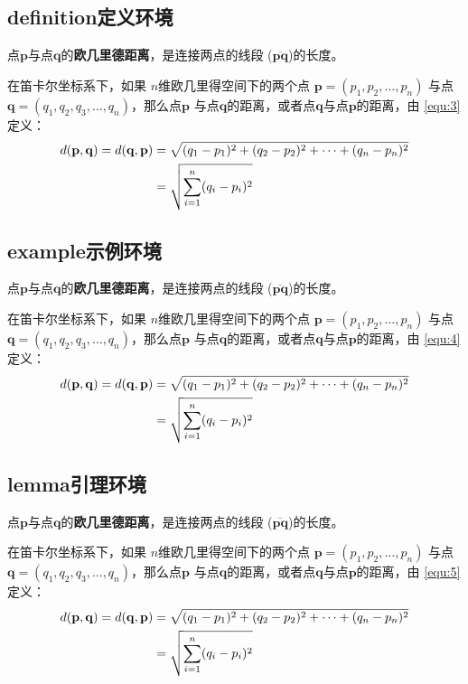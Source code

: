 \subsection{definition定义环境}

\begin{definition}[欧几里得距离]
点$\mathbf{p}$与点$\mathbf{q}$的\textbf{欧几里德距离}，是连接两点的线段
($\overline{\mathbf{pq}}$)的长度。

在笛卡尔坐标系下，如果 $n$维欧几里得空间下的两个点 $\mathbf{p}=(p_1, p_2,
\dots, p_n)$ 与点$\mathbf{q} = (q_1, q_2, q_3, \dots, q_n)$，那么点$\mathbf{p}$
与点$\mathbf{q}$的距离，或者点$\mathbf{q}$与点$\mathbf{p}$的距离，由
\autoref{equ:3}定义：
\begin{align}
d(\mathbf{p},\mathbf{q}) = d(\mathbf{q},\mathbf{p}) & = \sqrt{(q_1-p_1)^2
                         + (q_2-p_2)^2 + \cdots + (q_n-p_n)^2} \notag \\
\label{equ:3}
& = \sqrt{\sum_{i=1}^n (q_i-p_i)^2}
\end{align}
\end{definition}

\subsection{example示例环境}

\begin{example}[欧几里得距离]
点$\mathbf{p}$与点$\mathbf{q}$的\textbf{欧几里德距离}，是连接两点的线段
($\overline{\mathbf{pq}}$)的长度。

在笛卡尔坐标系下，如果 $n$维欧几里得空间下的两个点 $\mathbf{p}=(p_1, p_2,
\dots, p_n)$ 与点$\mathbf{q} = (q_1, q_2, q_3, \dots, q_n)$，那么点$\mathbf{p}$
与点$\mathbf{q}$的距离，或者点$\mathbf{q}$与点$\mathbf{p}$的距离，由
\autoref{equ:4}定义：
\begin{align}
d(\mathbf{p},\mathbf{q}) = d(\mathbf{q},\mathbf{p}) & = \sqrt{(q_1-p_1)^2
                         + (q_2-p_2)^2 + \cdots + (q_n-p_n)^2} \notag \\
\label{equ:4}
& = \sqrt{\sum_{i=1}^n (q_i-p_i)^2}
\end{align}
\end{example}

\subsection{lemma引理环境}

\begin{lemma}[欧几里得距离]
点$\mathbf{p}$与点$\mathbf{q}$的\textbf{欧几里德距离}，是连接两点的线段
($\overline{\mathbf{pq}}$)的长度。

在笛卡尔坐标系下，如果 $n$维欧几里得空间下的两个点 $\mathbf{p}=(p_1, p_2,
\dots, p_n)$ 与点$\mathbf{q} = (q_1, q_2, q_3, \dots, q_n)$，那么点$\mathbf{p}$
与点$\mathbf{q}$的距离，或者点$\mathbf{q}$与点$\mathbf{p}$的距离，由
\autoref{equ:5}定义：
\begin{align}
d(\mathbf{p},\mathbf{q}) = d(\mathbf{q},\mathbf{p}) & = \sqrt{(q_1-p_1)^2
                         + (q_2-p_2)^2 + \cdots + (q_n-p_n)^2} \notag \\
\label{equ:5}
& = \sqrt{\sum_{i=1}^n (q_i-p_i)^2}
\end{align}
\end{lemma}


